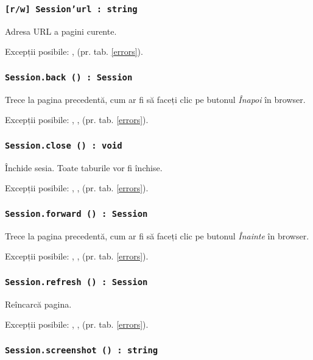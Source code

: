 \subsubsection{\texttt{[r/w] Session'url : string}}

Adresa URL a pagini curente.

Excepții posibile: ,  (pr. tab. \ref{errors}).

\subsubsection{\texttt{Session.back () : Session}}

Trece la pagina precedentă, cum ar fi să faceți clic pe butonul \textit{Înapoi} în browser.

Excepții posibile: , ,  (pr. tab. \ref{errors}).

\subsubsection{\texttt{Session.close () : void}}

Închide sesia. Toate taburile vor fi închise.

Excepții posibile: , ,  (pr. tab. \ref{errors}).

\subsubsection{\texttt{Session.forward () : Session}}

Trece la pagina precedentă, cum ar fi să faceți clic pe butonul \textit{Înainte} în browser.

Excepții posibile: , ,  (pr. tab. \ref{errors}).

\subsubsection{\texttt{Session.refresh () : Session}}

Reîncarcă pagina.

Excepții posibile: , ,  (pr. tab. \ref{errors}).

\subsubsection{\texttt{Session.screenshot () : string}}

